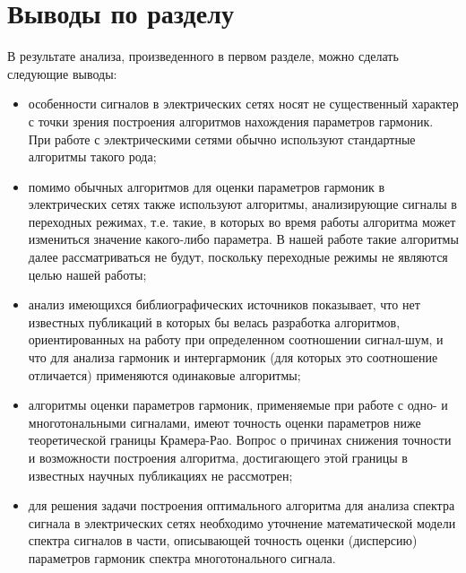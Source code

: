 \section{Выводы по разделу} \label{sec:ch1/sec7} 
В результате анализа, произведенного в первом разделе, можно сделать следующие выводы:
\begin{itemize}
\item особенности сигналов в электрических сетях носят не существенный характер с точки зрения построения алгоритмов нахождения параметров гармоник. При работе с электрическими сетями обычно используют стандартные алгоритмы такого рода;
	
\item помимо обычных алгоритмов для оценки параметров гармоник в электрических сетях также используют алгоритмы, анализирующие сигналы в переходных режимах, т.е. такие, в которых во время работы алгоритма может измениться значение какого-либо параметра. В нашей работе такие алгоритмы далее рассматриваться не будут, поскольку переходные режимы не являются целью нашей работы;
	
\item анализ имеющихся библиографических источников показывает, что нет известных публикаций в которых бы велась разработка алгоритмов, ориентированных на работу при определенном соотношении сигнал-шум, и что для анализа гармоник и интергармоник (для которых это соотношение отличается) применяются одинаковые алгоритмы;
	
\item алгоритмы оценки параметров гармоник, применяемые при работе с одно- и многотональными сигналами, имеют точность оценки параметров ниже теоретической границы Крамера-Рао. Вопрос о причинах снижения точности и возможности построения алгоритма, достигающего этой границы в известных научных публикациях не рассмотрен;
	
\item для решения задачи построения оптимального алгоритма для анализа спектра сигнала в электрических сетях необходимо уточнение математической модели спектра сигналов в части, описывающей точность оценки (дисперсию) параметров гармоник спектра многотонального сигнала.
\end{itemize}

